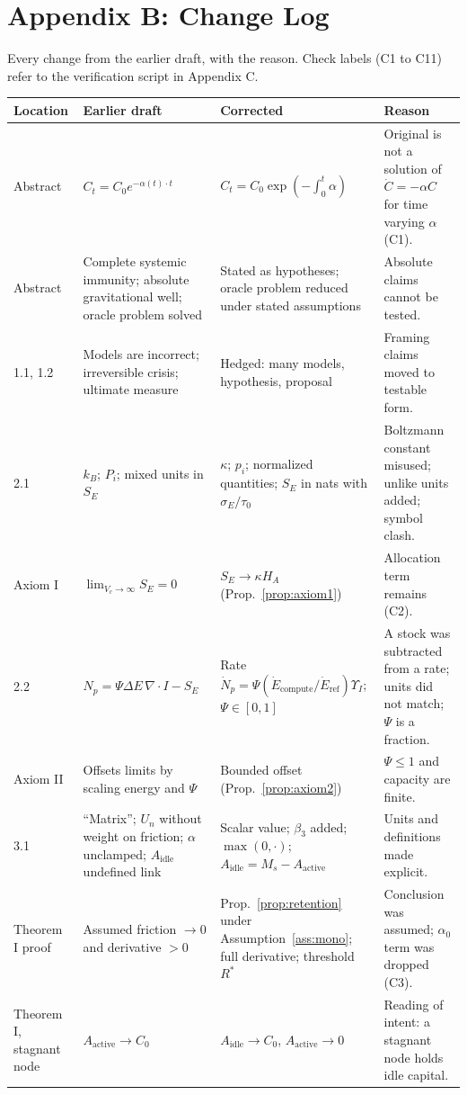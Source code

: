 \documentclass[11pt,a4paper]{article}
\theoremstyle{definition}
\theoremstyle{plain}
\theoremstyle{remark}
\newcommand{\Edot}{\dot E_{\mathrm{compute}}}
\newcommand{\Eref}{\dot E_{\mathrm{ref}}}
\begin{document}
\section*{Appendix B: Change Log}
Every change from the earlier draft, with the reason. Check labels (C1 to C11) refer to the verification script in Appendix C.
\begin{longtable}{@{}p{1.9cm}p{4.0cm}p{5.2cm}p{4.1cm}@{}}
\toprule
Location & Earlier draft & Corrected & Reason \\
\midrule
\endhead
Abstract & $C_t = C_0 e^{-\alpha(t)\cdot t}$ & $C_t = C_0\exp(-\int_0^t\alpha)$ & Original is not a solution of $\dot C = -\alpha C$ for time varying $\alpha$ (C1). \\
Abstract & Complete systemic immunity; absolute gravitational well; oracle problem solved & Stated as hypotheses; oracle problem reduced under stated assumptions & Absolute claims cannot be tested. \\
1.1, 1.2 & Models are incorrect; irreversible crisis; ultimate measure & Hedged: many models, hypothesis, proposal & Framing claims moved to testable form. \\
2.1 & $k_B$; $P_i$; mixed units in $S_E$ & $\kappa$; $p_i$; normalized quantities; $S_E$ in nats with $\sigma_E/\tau_0$ & Boltzmann constant misused; unlike units added; symbol clash. \\
Axiom I & $\lim_{V_c\to\infty} S_E = 0$ & $S_E \to \kappa H_A$ (Prop.~\ref{prop:axiom1}) & Allocation term remains (C2). \\
2.2 & $N_p = \Psi\Delta E\,\nabla\!\cdot I - S_E$ & Rate $\dot N_p = \Psi(\Edot/\Eref)\Upsilon_I$; $\Psi \in [0,1]$ & A stock was subtracted from a rate; units did not match; $\Psi$ is a fraction. \\
Axiom II & Offsets limits by scaling energy and $\Psi$ & Bounded offset (Prop.~\ref{prop:axiom2}) & $\Psi \le 1$ and capacity are finite. \\
3.1 & ``Matrix''; $U_n$ without weight on friction; $\alpha$ unclamped; $A_{\mathrm{idle}}$ undefined link & Scalar value; $\beta_3$ added; $\max(0,\cdot)$; $A_{\mathrm{idle}} = M_s - A_{\mathrm{active}}$ & Units and definitions made explicit. \\
Theorem I proof & Assumed friction $\to 0$ and derivative $> 0$ & Prop.~\ref{prop:retention} under Assumption~\ref{ass:mono}; full derivative; threshold $R^{*}$ & Conclusion was assumed; $\alpha_0$ term was dropped (C3). \\
Theorem I, stagnant node & $A_{\mathrm{active}} \to C_0$ & $A_{\mathrm{idle}} \to C_0$, $A_{\mathrm{active}}\to 0$ & Reading of intent: a stagnant node holds idle capital. \\

\end{longtable}
\end{document}
